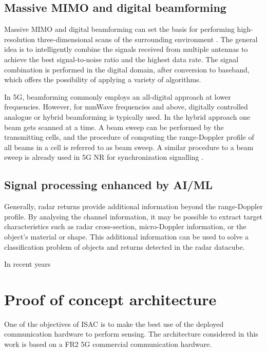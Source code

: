 	
	\subsection{Massive MIMO and digital beamforming}
	
	Massive MIMO and digital beamforming can set the basis for performing high-resolution three-dimensional scans of the surrounding environment \cite{MIMO-next-gen}.
	The general idea is to intelligently combine the signals received from multiple antennas to achieve the best signal-to-noise ratio and the highest data rate. The signal combination is performed in the digital domain, after conversion to baseband, which offers the possibility of applying a variety of algorithms.
	
	In 5G, beamforming commonly employs an all-digital approach at lower frequencies. However, for mmWave frequencies and above, digitally controlled analogue or hybrid beamforming is typically used. In the hybrid approach one beam gets scanned at a time. A beam sweep can be performed by the transmitting cells, and the procedure of computing the range-Doppler profile of all beams in a cell is referred to as beam sweep. A similar procedure to a beam sweep is already used in 5G NR for synchronization signalling \cite{Wild_Braun_Viswanathan_2021}.
	
	\subsection{Signal processing enhanced by AI/ML}
	Generally, radar returns provide additional information beyond the range-Doppler profile. By analysing the channel information, it may be possible to extract target characteristics such as radar cross-section, micro-Doppler information, or the object's material or shape.
	This additional information can be used to solve a classification problem of objects and returns detected in the radar datacube.
	
	In recent years


\section{Proof of concept architecture}
	\label{sec:intro-PoCarchitecture}
	
	One of the objectives of ISAC is to make the best use of the deployed communication hardware to perform sensing. 
	The architecture considered in this work is based on a FR2 5G commercial communication hardware.
	
